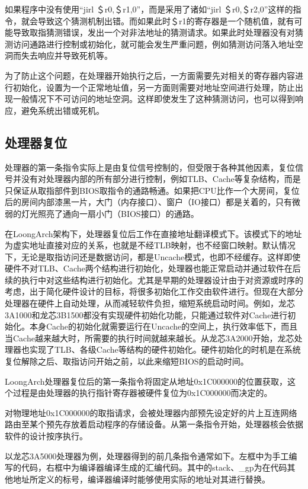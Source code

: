 \documentclass[]{ctexbook}
\begin{document}
如果程序中没有使用``jirl ＄r0,＄r1,0''，而是采用了诸如``jirl ＄r0,＄r2,0''这样的指令，就会导致这个猜测机制出错。而如果此时＄r1的寄存器是一个随机值，就有可能导致取指猜测错误，发出一个对非法地址的猜测请求。如果此时处理器没有对猜测访问通路进行控制或初始化，就可能会发生严重问题，例如猜测访问落入地址空洞而失去响应并导致死机等。

为了防止这个问题，在处理器开始执行之后，一方面需要先对相关的寄存器内容进行初始化，设置为一个正常地址值，另一方面则需要对地址空间进行处理，防止出现一般情况下不可访问的地址空洞。这样即使发生了这种猜测访问，也可以得到响应，避免系统出错或死机。

\hypertarget{sec-cpu-reset}{%
\subsection{处理器复位}\label{sec-cpu-reset}}

处理器的第一条指令实际上是由复位信号控制的，但受限于各种其他因素，复位信号并没有对处理器内部的所有部分进行控制，例如TLB、Cache等复杂结构，而是只保证从取指部件到BIOS取指令的通路畅通。如果把CPU比作一个大房间，复位后的房间内部漆黑一片，大门（内存接口）、窗户（IO接口）都是关着的，只有微弱的灯光照亮了通向一扇小门（BIOS接口）的通路。

在LoongArch架构下，处理器复位后工作在直接地址翻译模式下。该模式下的地址为虚实地址直接对应的关系，也就是不经TLB映射，也不经窗口映射。默认情况下，无论是取指访问还是数据访问，都是Uncache模式，也即不经缓存。这样即使硬件不对TLB、Cache两个结构进行初始化，处理器也能正常启动并通过软件在后续的执行中对这些结构进行初始化。尤其是早期的处理器设计由于对资源或时序的考虑，出于简化硬件设计的目标，将很多初始化工作交由软件进行。但现在大部分处理器在硬件上自动处理，从而减轻软件负担，缩短系统启动时间。例如，龙芯3A1000和龙芯3B1500都没有实现硬件初始化功能，只能通过软件对Cache进行初始化。本身Cache的初始化就需要运行在Uncache的空间上，执行效率低下，而且当Cache越来越大时，所需要的执行时间就越来越长。从龙芯3A2000开始，龙芯处理器也实现了TLB、各级Cache等结构的硬件初始化。硬件初始化的时机是在系统复位解除之后、取指访问开始之前，以此来缩短BIOS的启动时间。

LoongArch处理器复位后的第一条指令将固定从地址0x1C000000的位置获取，这个过程是由处理器的执行指针寄存器被硬件复位为0x1C000000而决定的。

对物理地址0x1C000000的取指请求，会被处理器内部预先设定好的片上互连网络路由至某个预先存放着启动程序的存储设备。从第一条指令开始，处理器核会依据软件的设计按序执行。

以龙芯3A5000处理器为例，处理器得到的前几条指令通常如下。左框中为手工编写的代码，右框中为编译器编译生成的汇编代码。其中的stack、\_gp为在代码其他地址所定义的标号，编译器编译时能够使用实际的地址对其进行替换。
\end{document}
